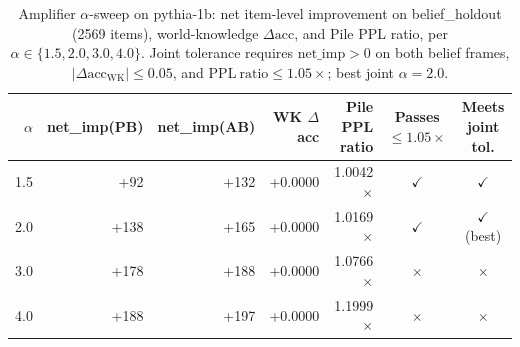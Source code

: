 \begin{table}[t]
\centering
\caption{Amplifier $\alpha$-sweep on pythia-1b: net item-level improvement on belief\_holdout (2569 items), world-knowledge $\Delta\mathrm{acc}$, and Pile PPL ratio, per $\alpha \in \{1.5, 2.0, 3.0, 4.0\}$. Joint tolerance requires $\mathrm{net\_imp} > 0$ on both belief frames, $|\Delta\mathrm{acc}_{\mathrm{WK}}| \le 0.05$, and $\mathrm{PPL~ratio} \le 1.05\times$; best joint $\alpha = 2.0$.}
\label{tab:c4_alpha_sweep}
\begin{tabular}{rrrrrcc}
\toprule
$\alpha$ & net\_imp(PB) & net\_imp(AB) & WK $\Delta$acc & Pile PPL ratio & Passes $\le 1.05\times$ & Meets joint tol. \\
\midrule
1.5 & +92 & +132 & +0.0000 & 1.0042$\times$ & $\checkmark$ & $\checkmark$ \\
2.0 & +138 & +165 & +0.0000 & 1.0169$\times$ & $\checkmark$ & $\checkmark$ (best) \\
3.0 & +178 & +188 & +0.0000 & 1.0766$\times$ & $\times$ & $\times$ \\
4.0 & +188 & +197 & +0.0000 & 1.1999$\times$ & $\times$ & $\times$ \\
\bottomrule
\end{tabular}
\end{table}
